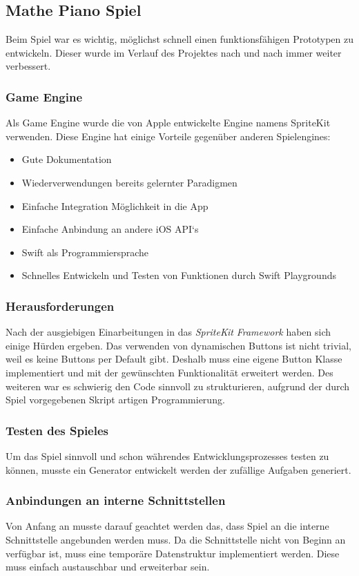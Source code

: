 \subsection{Mathe Piano Spiel}
Beim Spiel war es wichtig, möglichst schnell einen funktionsfähigen Prototypen zu entwickeln. Dieser wurde im Verlauf des Projektes nach und nach immer weiter verbessert.
\subsubsection{Game Engine}
Als Game Engine wurde die von Apple entwickelte Engine namens SpriteKit verwenden. Diese Engine hat einige Vorteile gegenüber anderen Spielengines:
\begin{itemize}
\item Gute Dokumentation
\item Wiederverwendungen bereits gelernter Paradigmen    
\item Einfache Integration Möglichkeit in die App
\item Einfache Anbindung an andere iOS API‘s
\item Swift als Programmiersprache 
\item Schnelles Entwickeln und Testen von Funktionen durch Swift Playgrounds
\end{itemize}

\subsubsection{Herausforderungen}
Nach der ausgiebigen Einarbeitungen in das \textit{SpriteKit} \textit{Framework} haben sich einige Hürden ergeben. Das verwenden von dynamischen Buttons ist nicht trivial, weil es keine Buttons per Default gibt. Deshalb muss eine eigene Button Klasse implementiert und mit der gewünschten Funktionalität erweitert werden. Des weiteren war es schwierig den Code sinnvoll zu strukturieren, aufgrund der durch Spiel vorgegebenen Skript artigen Programmierung. 
\subsubsection{Testen des Spieles}
Um das Spiel sinnvoll und schon währendes Entwicklungsprozesses testen zu können, musste ein Generator entwickelt werden der zufällige Aufgaben generiert. 
\subsubsection{Anbindungen an interne Schnittstellen}
Von Anfang an musste darauf geachtet werden das, dass Spiel an die interne Schnittstelle angebunden werden muss. Da die Schnittstelle nicht von Beginn an verfügbar ist, muss eine temporäre Datenstruktur implementiert werden. Diese muss einfach austauschbar und erweiterbar sein.
